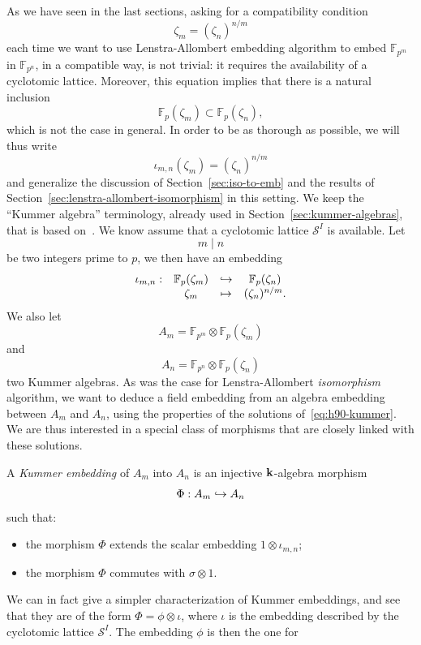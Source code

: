 As we have seen in the last sections, asking for a compatibility condition
\[
  \zeta_m = (\zeta_n)^{n/m}
\]
each time we want to use Lenstra-Allombert embedding algorithm to embed
$\mathbb{F}_{p^m}$ in $\mathbb{F}_{p^n}$, in a compatible way, is not trivial:
it requires the availability of a cyclotomic lattice. Moreover, this equation
implies that there is a natural inclusion
\[
  \mathbb{F}_{p}(\zeta_m)\subset\mathbb{F}_{p}(\zeta_n),
\]
which is not the case in general. In order to be as thorough as possible, we
will thus write
\[
  \iota_{m, n}(\zeta_m) = (\zeta_{n})^{n/m}
\]
and generalize the discussion of Section~\ref{sec:iso-to-emb} and the results of
Section~\ref{sec:lenstra-allombert-isomorphism} in this setting. We keep the
``Kummer algebra'' terminology, already used in
Section~\ref{sec:kummer-algebras}, that is based on~\cite{DRR19}. We know assume
that a cyclotomic lattice $\mathcal S^I$ is available. Let
\[
  m\mid n
\]
be two integers prime to $p$, we then have an embedding
\[
\begin{array}{cccc}
  \iota_{m, n}: & \mathbb{F}_{p}(\zeta_m)& \hookrightarrow &\mathbb{F}_{p}(\zeta_n)\\
  & \zeta_m & \mapsto & (\zeta_n)^{n/m}.
\end{array}
\]
We also let
\[
  A_m=\mathbb{F}_{p^m}\otimes\mathbb{F}_{p}(\zeta_m)
\]
and
\[
  A_n=\mathbb{F}_{p^n}\otimes\mathbb{F}_{p}(\zeta_n)
\]
two Kummer algebras. As was the case for
Lenstra-Allombert \emph{isomorphism} algorithm, we want to deduce a field
embedding from an algebra embedding between $A_m$ and $A_n$, using the
properties of the solutions of~\eqref{eq:h90-kummer}. We are thus
interested in a special class of morphisms that are closely linked with
these solutions.
\begin{defi}
  \label{defi:kummer-embedding}
  A \emph{Kummer embedding} of $A_m$ into $A_n$ is an injective
  $\mathbf{k}$-algebra morphism
  \[
    \Phi:A_m\hookrightarrow A_n
  \]
  such that:
  \begin{itemize}
    \item the morphism $\Phi$ extends the scalar embedding
      $1\otimes\iota_{m,n}$;
    \item the morphism $\Phi$ commutes with $\sigma\otimes1$.
  \end{itemize}
\end{defi}
We can in fact give a simpler characterization of Kummer embeddings, and see that
they are of the form $\Phi=\phi\otimes\iota$, where $\iota$ is the embedding
described by the cyclotomic lattice $\mathcal S^I$. The embedding $\phi$ is then the one for
